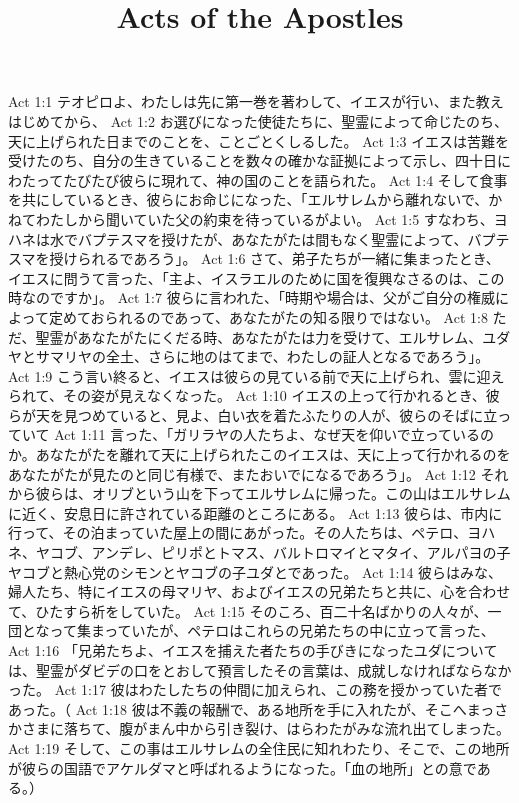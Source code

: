 

\title{Acts of the Apostles}

Act 1:1  テオピロよ、わたしは先に第一巻を著わして、イエスが行い、また教えはじめてから、
Act 1:2  お選びになった使徒たちに、聖霊によって命じたのち、天に上げられた日までのことを、ことごとくしるした。
Act 1:3  イエスは苦難を受けたのち、自分の生きていることを数々の確かな証拠によって示し、四十日にわたってたびたび彼らに現れて、神の国のことを語られた。
Act 1:4  そして食事を共にしているとき、彼らにお命じになった、「エルサレムから離れないで、かねてわたしから聞いていた父の約束を待っているがよい。
Act 1:5  すなわち、ヨハネは水でバプテスマを授けたが、あなたがたは間もなく聖霊によって、バプテスマを授けられるであろう」。
Act 1:6  さて、弟子たちが一緒に集まったとき、イエスに問うて言った、「主よ、イスラエルのために国を復興なさるのは、この時なのですか」。
Act 1:7  彼らに言われた、「時期や場合は、父がご自分の権威によって定めておられるのであって、あなたがたの知る限りではない。
Act 1:8  ただ、聖霊があなたがたにくだる時、あなたがたは力を受けて、エルサレム、ユダヤとサマリヤの全土、さらに地のはてまで、わたしの証人となるであろう」。
Act 1:9  こう言い終ると、イエスは彼らの見ている前で天に上げられ、雲に迎えられて、その姿が見えなくなった。
Act 1:10  イエスの上って行かれるとき、彼らが天を見つめていると、見よ、白い衣を着たふたりの人が、彼らのそばに立っていて
Act 1:11  言った、「ガリラヤの人たちよ、なぜ天を仰いで立っているのか。あなたがたを離れて天に上げられたこのイエスは、天に上って行かれるのをあなたがたが見たのと同じ有様で、またおいでになるであろう」。
Act 1:12  それから彼らは、オリブという山を下ってエルサレムに帰った。この山はエルサレムに近く、安息日に許されている距離のところにある。
Act 1:13  彼らは、市内に行って、その泊まっていた屋上の間にあがった。その人たちは、ペテロ、ヨハネ、ヤコブ、アンデレ、ピリポとトマス、バルトロマイとマタイ、アルパヨの子ヤコブと熱心党のシモンとヤコブの子ユダとであった。
Act 1:14  彼らはみな、婦人たち、特にイエスの母マリヤ、およびイエスの兄弟たちと共に、心を合わせて、ひたすら祈をしていた。
Act 1:15  そのころ、百二十名ばかりの人々が、一団となって集まっていたが、ペテロはこれらの兄弟たちの中に立って言った、
Act 1:16  「兄弟たちよ、イエスを捕えた者たちの手びきになったユダについては、聖霊がダビデの口をとおして預言したその言葉は、成就しなければならなかった。
Act 1:17  彼はわたしたちの仲間に加えられ、この務を授かっていた者であった。（
Act 1:18  彼は不義の報酬で、ある地所を手に入れたが、そこへまっさかさまに落ちて、腹がまん中から引き裂け、はらわたがみな流れ出てしまった。
Act 1:19  そして、この事はエルサレムの全住民に知れわたり、そこで、この地所が彼らの国語でアケルダマと呼ばれるようになった。「血の地所」との意である。）
